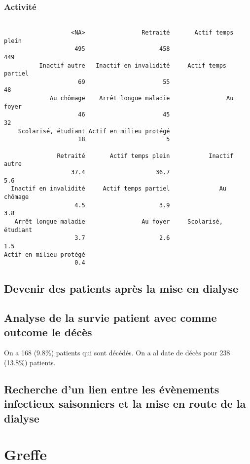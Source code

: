 \documentclass[11pt,a4paper]{article}\usepackage[]{graphicx}\usepackage[]{color}
\makeatletter
\newenvironment{kframe}{%
 \def\at@end@of@kframe{}%
 \ifinner\ifhmode%
  \def\at@end@of@kframe{\end{minipage}}%
  \begin{minipage}{\columnwidth}%
 \fi\fi%
 \def\FrameCommand##1{\hskip\@totalleftmargin \hskip-\fboxsep
 \colorbox{shadecolor}{##1}\hskip-\fboxsep
     \hskip-\linewidth \hskip-\@totalleftmargin \hskip\columnwidth}%
 \MakeFramed {\advance\hsize-\width
   \@totalleftmargin\z@ \linewidth\hsize
   \@setminipage}}%
 {\par\unskip\endMakeFramed%
 \at@end@of@kframe}
\newenvironment{knitrout}{}{} %
\makeatother
\begin{document}
    \subsubsection{Activité}

\begin{knitrout}
\color{fgcolor}\begin{kframe}
\begin{verbatim}

                   <NA>                Retraité       Actif temps plein 
                    495                     458                     449 
          Inactif autre   Inactif en invalidité     Actif temps partiel 
                     69                      55                      48 
             Au chômage    Arrêt longue maladie                Au foyer 
                     46                      45                      32 
    Scolarisé, étudiant Actif en milieu protégé 
                     18                       5 

               Retraité       Actif temps plein           Inactif autre 
                   37.4                    36.7                     5.6 
  Inactif en invalidité     Actif temps partiel              Au chômage 
                    4.5                     3.9                     3.8 
   Arrêt longue maladie                Au foyer     Scolarisé, étudiant 
                    3.7                     2.6                     1.5 
Actif en milieu protégé 
                    0.4 
\end{verbatim}
\end{kframe}
\end{knitrout}

  \subsection{Devenir des patients après la mise en dialyse}
  
  \subsection{Analyse de la survie patient avec comme outcome le décès}
  
  On a 168 (9.8\%) patients qui sont décédés. On a al date de décès pour 238 (13.8\%) patients.
  
  \subsection{Recherche d’un lien entre les évènements infectieux saisonniers et la mise en route de la dialyse}
  
\section{Greffe}
\end{document}
